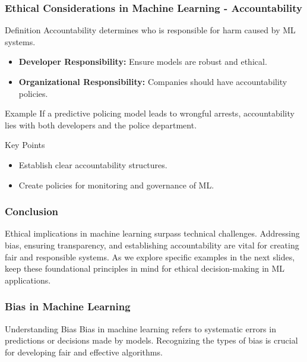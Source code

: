 \documentclass[aspectratio=169]{beamer}
\begin{document}
\begin{frame}[fragile]
    \frametitle{Ethical Considerations in Machine Learning - Accountability}
    \begin{block}{Definition}
        Accountability determines who is responsible for harm caused by ML systems.
    \end{block}
    \begin{itemize}
        \item \textbf{Developer Responsibility:} Ensure models are robust and ethical.
        \item \textbf{Organizational Responsibility:} Companies should have accountability policies.
    \end{itemize}

    \begin{block}{Example}
        If a predictive policing model leads to wrongful arrests, accountability lies with both developers and the police department.
    \end{block}

    \begin{block}{Key Points}
        \begin{itemize}
            \item Establish clear accountability structures.
            \item Create policies for monitoring and governance of ML.
        \end{itemize}
    \end{block}
\end{frame}

\begin{frame}[fragile]
    \frametitle{Conclusion}
    Ethical implications in machine learning surpass technical challenges. Addressing bias, ensuring transparency, and establishing accountability are vital for creating fair and responsible systems. 
    As we explore specific examples in the next slides, keep these foundational principles in mind for ethical decision-making in ML applications.
\end{frame}

\begin{frame}[fragile]
    \frametitle{Bias in Machine Learning}
    \begin{block}{Understanding Bias}
        Bias in machine learning refers to systematic errors in predictions or decisions made by models. 
        Recognizing the types of bias is crucial for developing fair and effective algorithms.
    \end{block}
\end{frame}
\end{document}
